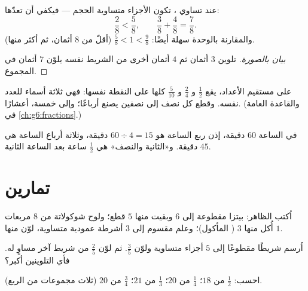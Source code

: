 \begin{proposition}\label{prop:g4:fractions:compare}
عند تساوي ، تكون الأجزاء متساوية الحجم --- فيكفي أن
تعدّها:
\[
\frac{2}{8} < \frac{5}{8},
\qquad
\frac{3}{8} + \frac{4}{8} = \frac{7}{8}.
\]
والمقارنة بالوحدة سهلة أيضًا: $\frac{5}{8} < 1 < \frac{9}{8}$
(أقلّ من $8$ أثمان، ثم أكثر منها).
\end{proposition}

\begin{proof}[بيان بالصورة]
تلوين $3$ أثمان ثم $4$ أثمان أخرى من الشريط نفسه يلوّن
$7$ أثمان في المجموع.
\end{proof}

\begin{example}\label{ex:g4:fractions:equal}
على مستقيم الأعداد، يقع $\frac12$ و $\frac24$ و $\frac{5}{10}$
كلها على النقطة نفسها: فهي ثلاثة أسماء للعدد نفسه. وقطع
كل نصف إلى نصفين يصنع أرباعًا؛ وإلى خمسة، أعشارًا. (والقاعدة
العامة في \cref{ch:g6:fractions}.)
\end{example}

\begin{example}\label{ex:g4:fractions:hour}
في الساعة $60$ دقيقة، إذن ربع الساعة هو
$60 \div 4 = 15$ دقيقة، وثلاثة أرباع الساعة هي
$45$ دقيقة. و«الثانية والنصف» هي $\frac12$ ساعة بعد الساعة
الثانية.
\end{example}

\section{تمارين}

\begin{exercise}[$\star$]\label{exo:g4:fractions:1}
اُكتب  الظاهر: بيتزا مقطوعة إلى $6$ وبقيت منها $5$ قطع؛
ولوح شوكولاتة من $8$ مربعات أُكل منها $3$ ( المأكول)؛
وعلم مقسوم إلى $3$ أشرطة عمودية متساوية، لوّن منها $1$.
\end{exercise}

\begin{exercise}[$\star$]\label{exo:g4:fractions:2}
اُرسم شريطًا مقطوعًا إلى $5$ أجزاء متساوية ولوّن $\frac35$. ثم لوّن
$\frac{2}{5}$ من شريط آخر مساوٍ له. فأي التلوينين أكبر؟
\end{exercise}

\begin{exercise}[$\star$]\label{exo:g4:fractions:3}
احسب: $\frac12$ من $18$؛ \quad $\frac14$ من $20$؛ \quad
$\frac13$ من $21$؛ \quad $\frac34$ من $20$ (ثلاث مجموعات من
الربع).
\end{exercise}


